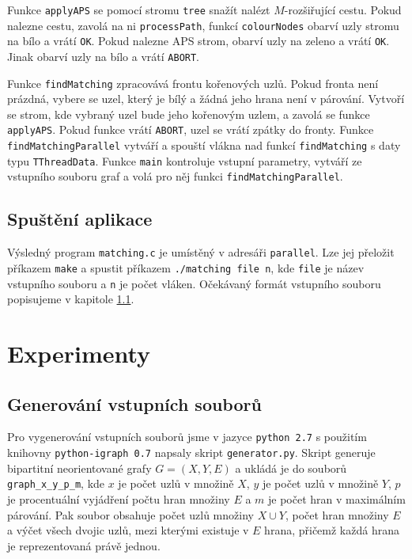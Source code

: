 \documentclass[a4paper, 11pt, titlepage, final]{article}[3. prosinec 2011]
\begin{document}
Funkce \texttt{applyAPS} se pomocí stromu \texttt{tree} snažít nalézt $M$-rozšiřující cestu. Pokud nalezne cestu, zavolá na ni \texttt{processPath}, funkcí \texttt{colourNodes} obarví uzly stromu na bílo a vrátí \texttt{OK}. Pokud nalezne APS strom, obarví uzly na zeleno a vrátí \texttt{OK}. Jinak obarví uzly na bílo a vrátí \texttt{ABORT}.

Funkce \texttt{findMatching} zpracovává frontu kořenových uzlů. Pokud fronta není prázdná, vybere se uzel, který je bílý a žádná jeho hrana není v párování. Vytvoří se strom, kde vybraný uzel bude jeho kořenovým uzlem, a zavolá se funkce \texttt{applyAPS}. Pokud funkce vrátí \texttt{ABORT}, uzel se vrátí zpátky do fronty. Funkce \texttt{findMatchingParallel} vytváří a spouští vlákna nad funkcí \texttt{findMatching} s daty typu \texttt{TThreadData}. Funkce \texttt{main} kontroluje vstupní parametry, vytváří ze vstupního souboru graf a volá pro něj funkci \texttt{findMatchingParallel}.

\subsection{Spuštění aplikace}

Výsledný program \texttt{matching.c} je umístěný v adresáři \texttt{parallel}. Lze jej přeložit příkazem \texttt{make} a spustit příkazem \texttt{./matching file n}, kde \texttt{file} je název vstupního souboru a \texttt{n} je počet vláken. Očekávaný formát vstupního souboru popisujeme v kapitole \ref{secGenerating}.

\section{Experimenty} \label{secExperiment}

\subsection{Generování vstupních souborů} \label{secGenerating}

Pro vygenerování vstupních souborů jsme v jazyce \texttt{python 2.7} s použitím knihovny \texttt{python-igraph 0.7} \cite{igraph:2003} napsaly skript \texttt{generator.py}. 
Skript generuje bipartitní neorientované grafy $G=(X,Y,E)$ a ukládá je do souborů \texttt{graph\_x\_y\_p\_m}, kde $x$ je počet uzlů v množině $X$, $y$ je počet uzlů v množině $Y$, $p$ je procentuální vyjádření počtu hran množiny $E$ a $m$ je počet hran v maximálním párování. Pak soubor obsahuje počet uzlů množiny $X \cup Y$, počet hran množiny $E$ a výčet všech dvojic uzlů, mezi kterými existuje v $E$ hrana, přičemž každá hrana je reprezentovaná právě jednou.
\end{document}
